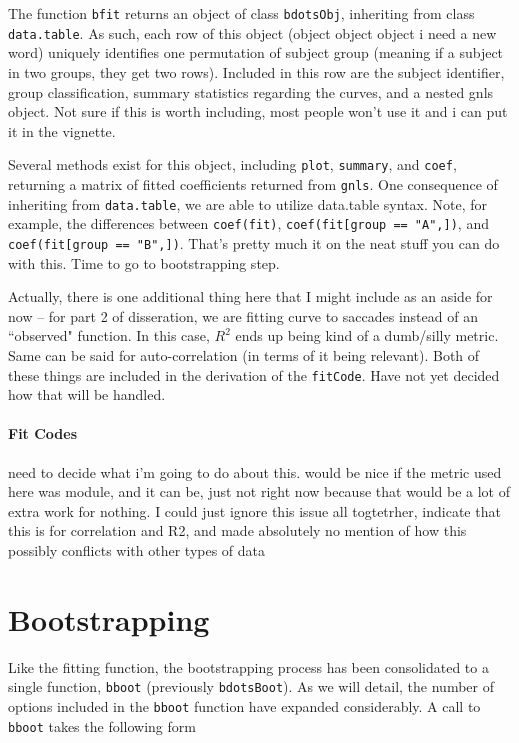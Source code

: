 \documentclass{article}
\newcommand{\xt}{\texttt}%
\begin{document}
The function \texttt{bfit} returns an object of class \texttt{bdotsObj}, inheriting from class \texttt{data.table}. As such, each row of this object (object object object i need a new word) uniquely identifies one permutation of subject group (meaning if a subject in two groups, they get two rows). Included in this row are the subject identifier, group classification, summary statistics regarding the curves, and a nested gnls object. Not sure if this is worth including, most people won't use it and i can put it in the vignette.


Several methods exist for this object, including \texttt{plot}, \texttt{summary}, and \texttt{coef}, returning a matrix of fitted coefficients returned from \texttt{gnls}. One consequence of inheriting from \texttt{data.table}, we are able to utilize data.table syntax. Note, for example, the differences between \texttt{coef(fit)}, \texttt{coef(fit[group == "A",])}, and \texttt{coef(fit[group == "B",])}. That's pretty much it on the neat stuff you can do with this. Time to go to bootstrapping step.

Actually, there is one additional thing here that I might include as an aside for now -- for part 2 of disseration, we are fitting curve to saccades instead of an ``observed" function. In this case, $R^2$ ends up being kind of a dumb/silly metric. Same can be said for auto-correlation (in terms of it being relevant). Both of these things are included in the derivation of the \texttt{fitCode}. Have not yet decided how that will be handled. 

\paragraph{Fit Codes}

need to decide what i'm going to do about this. would be nice if the metric used here was module, and it can be, just not right now because that would be a lot of extra work for nothing. I could just ignore this issue all togtetrher, indicate that this is for correlation and R2, and made absolutely no mention of how this possibly conflicts with other types of data

\section{Bootstrapping}

Like the fitting function, the bootstrapping process has been consolidated to a single function, \texttt{bboot} (previously \texttt{bdotsBoot}). As we will detail, the number of options included in the \xt{bboot} function have expanded considerably. A call to \xt{bboot} takes the following form
\end{document}
